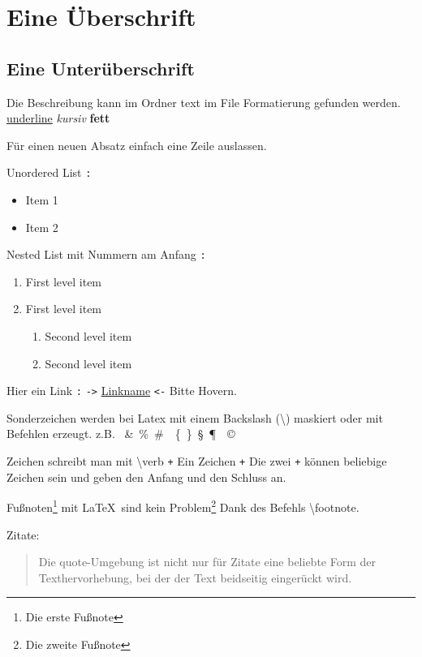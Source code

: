 \section{Eine Überschrift}
\label{sec:Eine_Überschrift}

\subsection{Eine Unterüberschrift}

Die Beschreibung kann im Ordner text im File Formatierung gefunden werden.
\underline{underline} \textit{kursiv} \textbf{fett}

Für einen neuen Absatz einfach eine Zeile auslassen.

Unordered List \verb-:-
\begin{itemize}
    \item  Item 1
    \item  Item 2
\end{itemize}

Nested List mit Nummern am Anfang \verb-:-
\begin{enumerate}
    \item First level item
    \item First level item
    \begin{enumerate}
        \item Second level item
        \item Second level item
    \end{enumerate}
\end{enumerate}

Hier ein Link \verb-:- \verb+->+
\href{http://detexify.kirelabs.org/classify.html}{Linkname}
\verb+<-+ Bitte Hovern.

Sonderzeichen werden bei Latex mit einem Backslash (\textbackslash) maskiert oder mit Befehlen erzeugt. z.B. \textdollar\ \&\ \%\ \#\ \textbar\ \{\ \}\ \S\ \P\ \textbullet\ \copyright\

Zeichen schreibt man mit \textbackslash verb \verb-+- Ein Zeichen \verb-+- Die zwei \verb-+- können
beliebige Zeichen sein und geben den Anfang und den Schluss an.

Fußnoten\footnote{Die erste Fußnote} mit \LaTeX\ sind kein Problem\footnote{Die zweite Fußnote} Dank des Befehls \textbackslash footnote.

Zitate:

\begin{quote}
    Die quote-Umgebung ist nicht nur für Zitate eine beliebte Form
    der Texthervorhebung, bei der der Text beidseitig eingerückt wird.
\end{quote}


